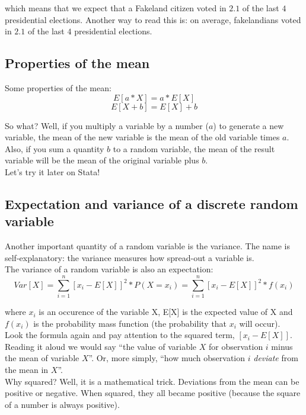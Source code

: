 \documentclass[11pt]{article}
\begin{document}
which means that we expect that a Fakeland citizen voted in $2.1$ of the last $4$ presidential elections. Another way to read this is: on average, fakelandians voted in $2.1$ of the last $4$ presidential elections.

	\subsection*{Properties of the mean}
	
	Some properties of the mean:
	\[E[a*X] = a * E[X]\]
	\[E[X+ b] = E[X] + b\]
	
	So what? Well, if you multiply a variable by a number ($a$) to generate a new variable, the mean of the new variable is the mean of the old variable times $a$.\\
	
	Also, if you sum a quantity $b$ to a random variable, the mean of the result variable will be the mean of the original variable plus $b$.\\
	
	Let's try it later on Stata!

	\subsection*{Expectation and variance of a discrete random variable}
	Another important quantity of a random variable is the variance. The name is self-explanatory: the variance measures how spread-out a variable is.\\
	
	The variance of a random variable is also an expectation:
	\[Var[X] = \sum\limits_{i=1}^n[x_i - E[X]]^2 * P(X=x_i) =\sum\limits_{i=1}^n[x_i - E[X]]^2 * f(x_i)\]
	
where $x_i$ is an occurence of the variable X, E[X] is the expected value of X and $f(x_i)$ is the probability mass function (the probability that $x_i$ will occur).\\

	Look the formula again and pay attention to the squared term, $[x_i - E[X]]$. Reading it aloud we would say ``the value of variable $X$ for observation $i$ minus the mean of variable $X$''. Or, more simply, ``how much observation $i$ \emph{deviate} from the mean in $X$''.\\

	Why squared? Well, it is a mathematical trick. Deviations from the mean can be positive or negative. When squared, they all became positive (because the square of a number is always positive).\\
	
\end{document}
